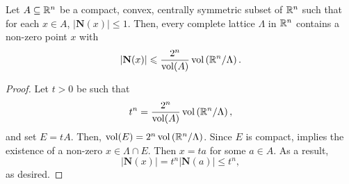 \begin{corollary}
    Let $A\subseteq\mathbb{R}^n$ be a compact, convex, centrally symmetric subset of $\mathbb{R}^n$ such that for each $x\in A$, $|\mathbf N(x)|\le 1$. Then, every complete lattice $\Lambda$ in $\mathbb{R}^n$ contains a non-zero point $x$ with 
    \begin{equation*}
        |\mathbf N(x)|\leqslant\frac{2^n}{\operatorname{vol}(A)}\operatorname{vol}\left(\mathbb{R}^n/\Lambda\right).
    \end{equation*}
\end{corollary}
\begin{proof}
    Let $t > 0$ be such that 
    \begin{equation*}
        t^n = \frac{2^n}{\operatorname{vol}(A)}\operatorname{vol}\left(\mathbb{R}^n/\Lambda\right),
    \end{equation*}
    and set $E = tA$. Then, $\operatorname{vol}(E) = 2^n\operatorname{vol}\left(\mathbb{R}^n/\Lambda\right)$. Since $E$ is compact,  implies the existence of a non-zero $x\in\Lambda\cap E$. Then $x = ta$ for some $a\in A$. As a result, 
    \begin{equation*}
        |\mathbf N(x)| = t^n\left|\mathbf N(a)\right|\le t^n,
    \end{equation*}
    as desired.
\end{proof}

